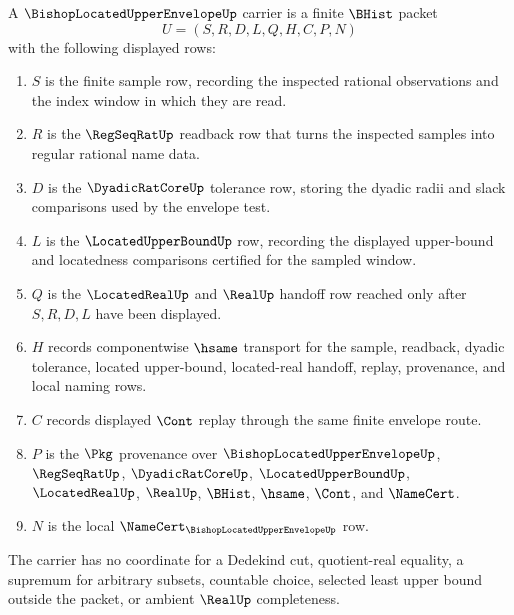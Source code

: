 \begin{definition}
\label{def:bishop-located-upper-envelope-carrier}
A $\BishopLocatedUpperEnvelopeUp$ carrier is a finite $\BHist$ packet
$$
U=(S,R,D,L,Q,H,C,P,N)
$$
with the following displayed rows:
\begin{enumerate}
\item $S$ is the finite sample row, recording the inspected rational observations and the index window in which they are read.
\item $R$ is the $\RegSeqRatUp$ readback row that turns the inspected samples into regular rational name data.
\item $D$ is the $\DyadicRatCoreUp$ tolerance row, storing the dyadic radii and slack comparisons used by the envelope test.
\item $L$ is the $\LocatedUpperBoundUp$ row, recording the displayed upper-bound and locatedness comparisons certified for the sampled window.
\item $Q$ is the $\LocatedRealUp$ and $\RealUp$ handoff row reached only after $S,R,D,L$ have been displayed.
\item $H$ records componentwise $\hsame$ transport for the sample, readback, dyadic tolerance, located upper-bound, located-real handoff, replay, provenance, and local naming rows.
\item $C$ records displayed $\Cont$ replay through the same finite envelope route.
\item $P$ is the $\Pkg$ provenance over $\BishopLocatedUpperEnvelopeUp$, $\RegSeqRatUp$, $\DyadicRatCoreUp$, $\LocatedUpperBoundUp$, $\LocatedRealUp$, $\RealUp$, $\BHist$, $\hsame$, $\Cont$, and $\NameCert$.
\item $N$ is the local $\NameCert_{\BishopLocatedUpperEnvelopeUp}$ row.
\end{enumerate}
The carrier has no coordinate for a Dedekind cut, quotient-real equality, a supremum for arbitrary subsets, countable choice, selected least upper bound outside the packet, or ambient $\RealUp$ completeness.
\end{definition}

